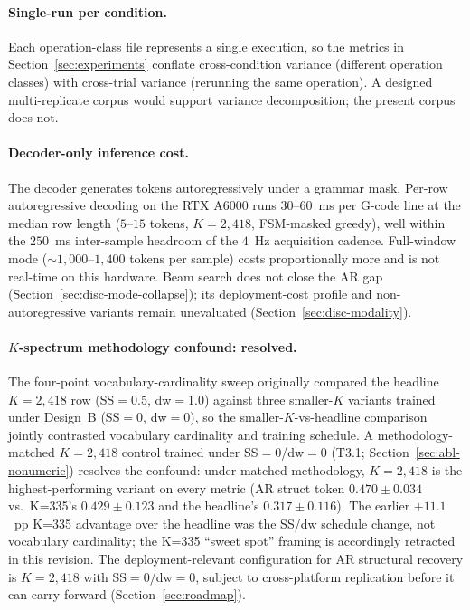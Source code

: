 \documentclass[sensors,article,submit,moreauthors,pdftex]{Definitions/mdpi}
\begin{document}
\paragraph{Single-run per condition.} Each operation-class file represents a single execution, so the metrics in Section~\ref{sec:experiments} conflate cross-condition variance (different operation classes) with cross-trial variance (rerunning the same operation). A designed multi-replicate corpus would support variance decomposition; the present corpus does not.

\paragraph{Decoder-only inference cost.} The decoder generates tokens autoregressively under a grammar mask. Per-row autoregressive decoding on the RTX A6000 runs $30$--$60$~ms per G-code line at the median row length ($5$--$15$ tokens, $K\!=\!2{,}418$, FSM-masked greedy), well within the $250$~ms inter-sample headroom of the $4$~Hz acquisition cadence. Full-window mode ($\sim$$1{,}000$--$1{,}400$ tokens per sample) costs proportionally more and is not real-time on this hardware. Beam search does not close the AR gap (Section~\ref{sec:disc-mode-collapse}); its deployment-cost profile and non-autoregressive variants remain unevaluated (Section~\ref{sec:disc-modality}).

\paragraph{$K$-spectrum methodology confound: resolved.} The four-point vocabulary-cardinality sweep originally compared the headline $K\!=\!2{,}418$ row (SS$=$0.5, dw$=$1.0) against three smaller-$K$ variants trained under Design~B (SS$=$0, dw$=$0), so the smaller-$K$-vs-headline comparison jointly contrasted vocabulary cardinality and training schedule. A methodology-matched $K\!=\!2{,}418$ control trained under SS$=$0/dw$=$0 (T3.1; Section~\ref{sec:abl-nonumeric}) resolves the confound: under matched methodology, $K\!=\!2{,}418$ is the highest-performing variant on every metric (AR struct token $0.470 \pm 0.034$ vs.\ K=335's $0.429 \pm 0.123$ and the headline's $0.317 \pm 0.116$). The earlier $+11.1$~pp K=335 advantage over the headline was the SS/dw schedule change, not vocabulary cardinality; the K=335 ``sweet spot'' framing is accordingly retracted in this revision. The deployment-relevant configuration for AR structural recovery is $K\!=\!2{,}418$ with SS$=$0/dw$=$0, subject to cross-platform replication before it can carry forward (Section~\ref{sec:roadmap}).
\end{document}
